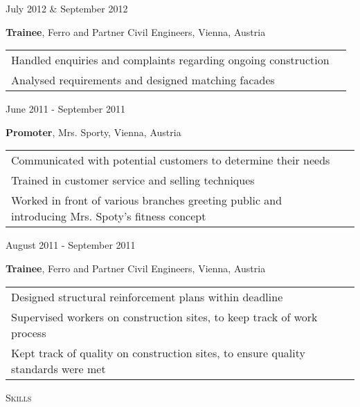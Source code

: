 \documentclass{article}
\newenvironment{changemargin}[2]{%
  \begin{list}{}{%
    \setlength{\topsep}{0pt}%
    \setlength{\leftmargin}{#1}%
    \setlength{\rightmargin}{#2}%
    \setlength{\listparindent}{\parindent}%
    \setlength{\itemindent}{\parindent}%
    \setlength{\parsep}{\parskip}%
  }%
  \item[]}{\end{list}
}
\newcommand{\header}[1]{
	\begin{changemargin}{-0.5in}{-0.5in}
		\large \textsc{#1}\\
		\vspace{-10pt}
		\raggedright
		\color{dark_grey}{\line(1,0){500}}
		\smallskip
	\end{changemargin}
}
\newenvironment{body} {
	\vspace*{-16pt}
	\begin{changemargin}{0in}{0in}
  }	
	{
\end{changemargin}
\medskip
}
\newcommand{\paraW}[4]{
	\begin{minipage}[t]{0.6\textwidth}
	\textbf{#1}, #2, #3 \vspace{2pt}\\
	\begin{tabular}{p{10cm}l}
		#4
	\end{tabular}
	\end{minipage}
	\medskip
}
\newcommand{\timerange}[1]{
	\begin{minipage}[t]{0.30\textwidth}
		#1
	\end{minipage}
}
\begin{document}
\begin{body}
	\timerange{July 2012 \& September 2012}
	\paraW{Trainee}{Ferro and Partner Civil Engineers}{Vienna, Austria}{
		Handled enquiries and complaints regarding ongoing construction \\
		Analysed requirements and designed matching facades \\
	}

	\timerange{June 2011 - September 2011}
	\paraW{Promoter}{Mrs. Sporty}{Vienna, Austria}{
		Communicated with potential customers to determine their needs \\
		Trained in customer service and selling techniques \\
		Worked in front of various branches greeting public and introducing Mrs. Spoty's fitness concept \\
	}


		\timerange{August 2011 - September 2011}
	\paraW{Trainee}{Ferro and Partner Civil Engineers}{Vienna, Austria}{
		Designed structural reinforcement plans within deadline \\
		Supervised workers on construction sites, to keep track of work process \\
		Kept track of quality on construction sites, to ensure quality standards were met\\
	}

\end{body}


\header{Skills}
\end{document}
